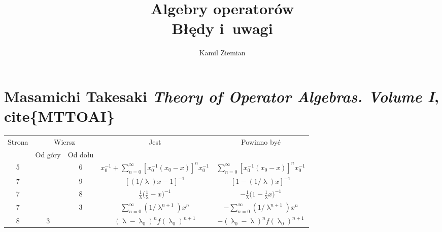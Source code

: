 \documentclass[a4paper,11pt]{article}
\title{Algebry operatorów \\
  {\Large Błędy i~uwagi}}
\author{Kamil Ziemian}
\numberwithin{equation}{section}
\renewcommand{\lambda}{\uplambda}
\begin{document}





\maketitle





\section{Masamichi Takesaki
  \textit{Theory of Operator Algebras. Volume I},
  cite\{MTTOAI\}}

\label{sec:TakesakiTheoryOfOperatorETC}





\begin{center}

  \begin{tabular}{|c|c|c|c|c|}
    \hline
    Strona & \multicolumn{2}{c|}{Wiersz}& Jest
    & Powinno być \\ \cline{2-3}
    & Od góry & Od dołu & & \\
    \hline
    5 & &  6 & $x_{ 0 }^{ -1 } + \sum\limits_{ n = 0 }^{ \infty }
              [ x_{ 0 }^{ -1 } ( x_{ 0 } - x ) ]^{ n } x_{ 0 }^{ -1 }$
           & $\sum\limits_{ n = 0 }^{ \infty } [ x_{ 0 }^{ -1 } ( x_{ 0 } - x ) ]^{ n }
             x_{ 0 }^{ -1 }$ \\
    7 & &  9 & $[ ( 1 / \lambda ) x - 1 ]^{ -1 }$
           & $[ 1 - ( 1 / \lambda ) x ]^{ -1 }$ \\
    7 & &  8 & $\frac{ 1 }{ \lambda } \big( \frac{ 1 }{ \lambda } - x \big)^{ -1 }$
           & $-\frac{ 1 }{ \lambda } \big( 1 - \frac{ 1 }{ \lambda } x \big)^{ -1 }$ \\
    7 & &  3 & $\sum\limits_{ n = 0 }^{ \infty } ( 1 / \lambda^{ n + 1 } ) x^{ n }$
           & $-\sum\limits_{ n = 0 }^{ \infty } ( 1 / \lambda^{ n + 1 } ) x^{ n }$ \\
    8 &  3 & & $( \lambda - \lambda_{ 0 } )^{ n } f( \lambda_{ 0 } )^{ n + 1 }$
           & $-( \lambda_{ 0 } - \lambda )^{ n } f( \lambda_{ 0 } )^{ n + 1 }$ \\
    \hline
  \end{tabular}

\end{center}
\end{document}
